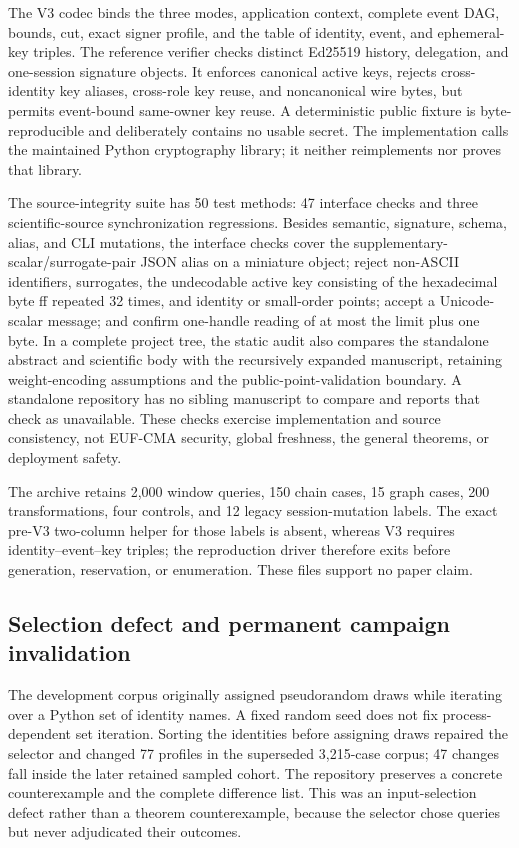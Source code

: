 \documentclass[11pt]{article}
\theoremstyle{definition}
\begin{document}
The V3 codec binds the three modes, application context, complete event DAG, bounds, cut, exact signer profile, and the table of identity, event, and ephemeral-key triples.  The reference verifier checks distinct Ed25519 history, delegation, and one-session signature objects.  It enforces canonical active keys, rejects cross-identity key aliases, cross-role key reuse, and noncanonical wire bytes, but permits event-bound same-owner key reuse.  A deterministic public fixture is byte-reproducible and deliberately contains no usable secret.  The implementation calls the maintained Python cryptography library; it neither reimplements nor proves that library.

The source-integrity suite has 50 test methods: 47 interface checks and three scientific-source synchronization regressions.  Besides semantic, signature, schema, alias, and CLI mutations, the interface checks cover the supplementary-scalar/surrogate-pair JSON alias on a miniature object; reject non-ASCII identifiers, surrogates, the undecodable active key consisting of the hexadecimal byte \textnormal{ff} repeated 32 times, and identity or small-order points; accept a Unicode-scalar message; and confirm one-handle reading of at most the limit plus one byte.  In a complete project tree, the static audit also compares the standalone abstract and scientific body with the recursively expanded manuscript, retaining weight-encoding assumptions and the public-point-validation boundary.  A standalone repository has no sibling manuscript to compare and reports that check as unavailable.  These checks exercise implementation and source consistency, not EUF-CMA security, global freshness, the general theorems, or deployment safety.

The archive retains 2,000 window queries, 150 chain cases, 15 graph cases, 200 transformations, four controls, and 12 legacy session-mutation labels.  The exact pre-V3 two-column helper for those labels is absent, whereas V3 requires identity--event--key triples; the reproduction driver therefore exits before generation, reservation, or enumeration.  These files support no paper claim.

\subsection{Selection defect and permanent campaign invalidation}
The development corpus originally assigned pseudorandom draws while iterating over a Python set of identity names.  A fixed random seed does not fix process-dependent set iteration.  Sorting the identities before assigning draws repaired the selector and changed 77 profiles in the superseded 3,215-case corpus; 47 changes fall inside the later retained sampled cohort.  The repository preserves a concrete counterexample and the complete difference list.  This was an input-selection defect rather than a theorem counterexample, because the selector chose queries but never adjudicated their outcomes.
\end{document}
